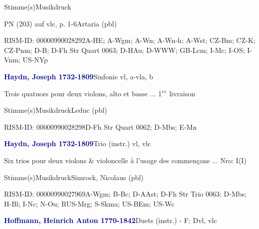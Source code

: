\documentclass[twocolumn]{book}
\begin{document}
\par \textcolor{darkblue}{}  Stimme(s)\newline Musikdruck
\par PN (203) auf vlc, p. 1-6\newline Artaria  (pbl)
\par RISM-ID: 00000990028292\newline A-HE; A-Wgm; A-Wn; A-Wn-h; A-Wst; CZ-Bm; CZ-K; CZ-Pnm; D-B; D-Fh  Str Quart 0063; D-HAu; D-WWW; GB-Lcm; I-Mc; I-OS; I-Vnm; US-NYp
\par \vspace{7pt} \textcolor{darkblue}{\textbf{Haydn, Joseph  1732-1809}}\hfillplus{\textbf{[286]}}\newline Sinfonie vl, a-vla, b
\par \begin{itshape}Trois quatuors pour deux violons, alto et basse ... 1$^r$$^e$ livraison\end{itshape} 
\par \textcolor{darkblue}{}  Stimme(s)\newline Musikdruck\newline Leduc  (pbl)
\par RISM-ID: 00000990028298\newline D-Fh  Str Quart 0062; D-Mbs; E-Mn
\par \vspace{7pt} \textcolor{darkblue}{\textbf{Haydn, Joseph  1732-1809}}\hfillplus{\textbf{[287]}}\newline Trio (instr.) vl, vlc
\par \begin{itshape}Six trios pour deux violons \& violoncelle à l'usage des commençans ... Nro: I(I)\end{itshape} 
\par \textcolor{darkblue}{}  Stimme(s)\newline Musikdruck\newline Simrock, Nicolaus  (pbl)
\par RISM-ID: 00000990027969\newline A-Wgm; B-Bc; D-AAst; D-Fh  Str Trio 0063; D-Mbs; H-Bl; I-Nc; N-Ou; RUS-Mrg; S-Skma; US-BEm; US-Wc
\par \vspace{7pt} \textcolor{darkblue}{\textbf{Hoffmann, Heinrich Anton  1770-1842}}\hfillplus{\textbf{[288]}}\newline Duets (instr.) - F; D\newline vl, vlc
\end{document}
